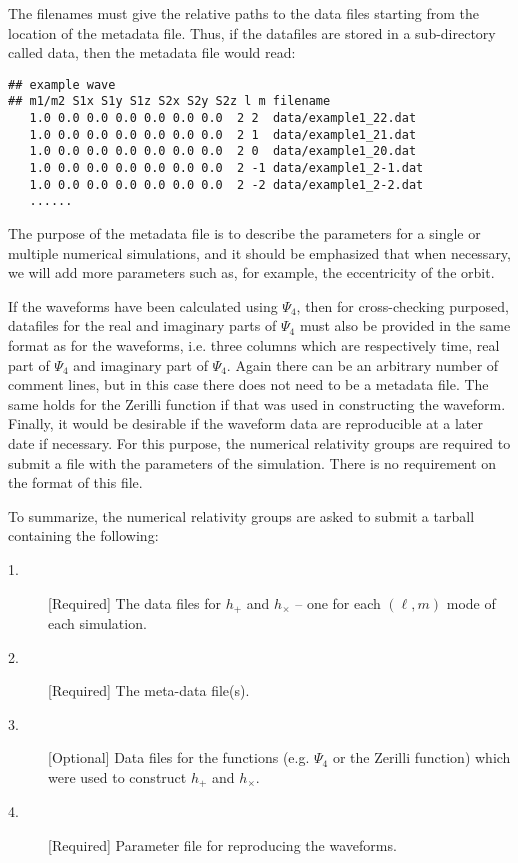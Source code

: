 \documentclass[10pt]{ligodcc}
\renewcommand{\texttt}[1]{{\ttfamily\color{blue}#1}}
\begin{document}
The filenames must give the relative paths to the data files starting
from the location of the metadata file.  Thus, if the datafiles are
stored in a sub-directory called \texttt{data}, then the metadata file
would read:
\begin{verbatim}
## example wave
## m1/m2 S1x S1y S1z S2x S2y S2z l m filename     
   1.0 0.0 0.0 0.0 0.0 0.0 0.0  2 2  data/example1_22.dat
   1.0 0.0 0.0 0.0 0.0 0.0 0.0  2 1  data/example1_21.dat
   1.0 0.0 0.0 0.0 0.0 0.0 0.0  2 0  data/example1_20.dat
   1.0 0.0 0.0 0.0 0.0 0.0 0.0  2 -1 data/example1_2-1.dat
   1.0 0.0 0.0 0.0 0.0 0.0 0.0  2 -2 data/example1_2-2.dat
   ......
\end{verbatim}
The purpose of the metadata file is to describe the parameters for a
single or multiple numerical simulations, and it should be emphasized
that when necessary, we will add more parameters such as, for example,
the eccentricity of the orbit.

If the waveforms have been calculated using $\Psi_4$, then for
cross-checking purposed, datafiles for the real and imaginary parts of
$\Psi_4$ must also be provided in the same format as for the
waveforms, i.e. three columns which are respectively time, real part
of $\Psi_4$ and imaginary part of $\Psi_4$.  Again there can be an
arbitrary number of comment lines, but in this case there does not
need to be a metadata file.  The same holds for the Zerilli function
if that was used in constructing the waveform. Finally, it would be
desirable if the waveform data are reproducible at a later date if
necessary.  For this purpose, the numerical relativity groups are
required to submit a file with the parameters of the simulation.
There is no requirement on the format of this file.  

To summarize, the numerical relativity groups are asked to submit a
tarball containing the following:
\begin{description}
\item[1.][Required] The data files for $h_+$ and $h_\times$ -- one for
  each $(\ell,m)$ mode of each simulation.
\item[2.][Required] The meta-data file(s).
\item[3.][Optional] Data files for the functions (e.g. $\Psi_4$ or the
  Zerilli function) which were used to construct $h_{+}$ and $h_{\times}$.
\item[4.][Required] Parameter file for reproducing the waveforms.
\end{description}
\end{document}

